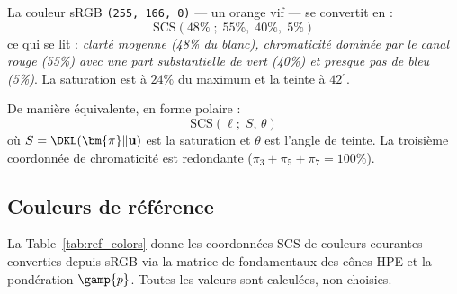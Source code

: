 \documentclass[12pt,a4paper]{article}
\begin{document}
\begin{example}
La couleur sRGB \texttt{(255, 166, 0)} --- un orange vif --- se
convertit en :
\[
  \mathrm{SCS}(48\%\;;\; 55\%,\; 40\%,\; 5\%)
\]
ce qui se lit : \emph{clart\'e moyenne (48\% du blanc), chromaticit\'e
domin\'ee par le canal rouge (55\%) avec une part substantielle de vert
(40\%) et presque pas de bleu (5\%)}. La saturation est \`a $24\%$ du
maximum et la teinte \`a $42^\circ$.
\end{example}

De mani\`ere \'equivalente, en forme polaire :
\begin{equation}
  \mathrm{SCS}(\ell;\; S,\, \theta)
\end{equation}
o\`u $S = \DKL(\bm{\pi}\|\mathbf{u})$ est la saturation et $\theta$
est l'angle de teinte. La troisi\`eme coordonn\'ee de chromaticit\'e
est redondante ($\pi_3 + \pi_5 + \pi_7 = 100\%$).

\subsection{Couleurs de r\'ef\'erence}

La Table~\ref{tab:ref_colors} donne les coordonn\'ees SCS de couleurs
courantes converties depuis sRGB via la matrice de fondamentaux des
c\^ones HPE et la pond\'eration $\gamp{p}$. Toutes les valeurs sont
calcul\'ees, non choisies.
\end{document}
